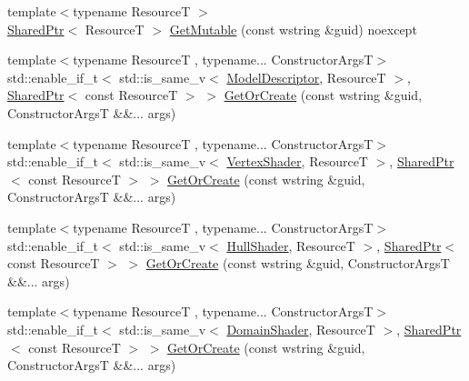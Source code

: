 \begin{DoxyCompactItemize}
\item 
{\footnotesize template$<$typename ResourceT $>$ }\\\hyperlink{namespacemage_a1e01ae66713838a7a67d30e44c67703e}{Shared\+Ptr}$<$ ResourceT $>$ \hyperlink{classmage_1_1_resource_manager_a4fb37f2f49e918e69e9acfe1ed0bb21b}{Get\+Mutable} (const wstring \&guid) noexcept
\item 
{\footnotesize template$<$typename ResourceT , typename... Constructor\+ArgsT$>$ }\\std\+::enable\+\_\+if\+\_\+t$<$ std\+::is\+\_\+same\+\_\+v$<$ \hyperlink{classmage_1_1_model_descriptor}{Model\+Descriptor}, ResourceT $>$, \hyperlink{namespacemage_a1e01ae66713838a7a67d30e44c67703e}{Shared\+Ptr}$<$ const ResourceT $>$ $>$ \hyperlink{classmage_1_1_resource_manager_a1ef26ddcc9e3f06fbe454794c8ea3b1d}{Get\+Or\+Create} (const wstring \&guid, Constructor\+ArgsT \&\&... args)
\item 
{\footnotesize template$<$typename ResourceT , typename... Constructor\+ArgsT$>$ }\\std\+::enable\+\_\+if\+\_\+t$<$ std\+::is\+\_\+same\+\_\+v$<$ \hyperlink{classmage_1_1_vertex_shader}{Vertex\+Shader}, ResourceT $>$, \hyperlink{namespacemage_a1e01ae66713838a7a67d30e44c67703e}{Shared\+Ptr}$<$ const ResourceT $>$ $>$ \hyperlink{classmage_1_1_resource_manager_a2195cf4c559bbf8473129623fbbefda7}{Get\+Or\+Create} (const wstring \&guid, Constructor\+ArgsT \&\&... args)
\item 
{\footnotesize template$<$typename ResourceT , typename... Constructor\+ArgsT$>$ }\\std\+::enable\+\_\+if\+\_\+t$<$ std\+::is\+\_\+same\+\_\+v$<$ \hyperlink{namespacemage_a964e5e384b0e55ac900c819da48b6000}{Hull\+Shader}, ResourceT $>$, \hyperlink{namespacemage_a1e01ae66713838a7a67d30e44c67703e}{Shared\+Ptr}$<$ const ResourceT $>$ $>$ \hyperlink{classmage_1_1_resource_manager_a82e7465ae1c2b3eadabe35b4ca9b4bb7}{Get\+Or\+Create} (const wstring \&guid, Constructor\+ArgsT \&\&... args)
\item 
{\footnotesize template$<$typename ResourceT , typename... Constructor\+ArgsT$>$ }\\std\+::enable\+\_\+if\+\_\+t$<$ std\+::is\+\_\+same\+\_\+v$<$ \hyperlink{namespacemage_aef8cda73e2387cb89baa6c54a7fea542}{Domain\+Shader}, ResourceT $>$, \hyperlink{namespacemage_a1e01ae66713838a7a67d30e44c67703e}{Shared\+Ptr}$<$ const ResourceT $>$ $>$ \hyperlink{classmage_1_1_resource_manager_ae8ec0451d309d4d77e97af02359b19af}{Get\+Or\+Create} (const wstring \&guid, Constructor\+ArgsT \&\&... args)

\end{DoxyCompactItemize}
